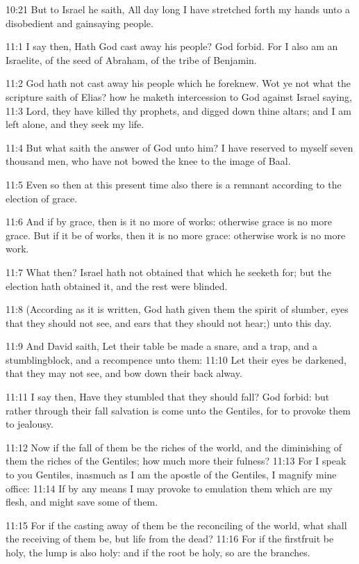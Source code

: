 10:21 But to Israel he saith, All day long I have stretched forth my
hands unto a disobedient and gainsaying people.

11:1 I say then, Hath God cast away his people? God forbid. For I also
am an Israelite, of the seed of Abraham, of the tribe of Benjamin.

11:2 God hath not cast away his people which he foreknew. Wot ye not
what the scripture saith of Elias? how he maketh intercession to God
against Israel saying, 11:3 Lord, they have killed thy prophets, and
digged down thine altars; and I am left alone, and they seek my life.

11:4 But what saith the answer of God unto him? I have reserved to
myself seven thousand men, who have not bowed the knee to the image of
Baal.

11:5 Even so then at this present time also there is a remnant
according to the election of grace.

11:6 And if by grace, then is it no more of works: otherwise grace is
no more grace. But if it be of works, then it is no more grace:
otherwise work is no more work.

11:7 What then? Israel hath not obtained that which he seeketh for;
but the election hath obtained it, and the rest were blinded.

11:8 (According as it is written, God hath given them the spirit of
slumber, eyes that they should not see, and ears that they should not
hear;) unto this day.

11:9 And David saith, Let their table be made a snare, and a trap, and
a stumblingblock, and a recompence unto them: 11:10 Let their eyes be
darkened, that they may not see, and bow down their back alway.

11:11 I say then, Have they stumbled that they should fall? God
forbid: but rather through their fall salvation is come unto the
Gentiles, for to provoke them to jealousy.

11:12 Now if the fall of them be the riches of the world, and the
diminishing of them the riches of the Gentiles; how much more their
fulness?  11:13 For I speak to you Gentiles, inasmuch as I am the
apostle of the Gentiles, I magnify mine office: 11:14 If by any means
I may provoke to emulation them which are my flesh, and might save
some of them.

11:15 For if the casting away of them be the reconciling of the world,
what shall the receiving of them be, but life from the dead?  11:16
For if the firstfruit be holy, the lump is also holy: and if the root
be holy, so are the branches.

